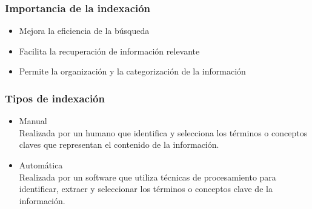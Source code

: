 \documentclass[
10pt, %
aspectratio=169, %
]{beamer}
\begin{document}
	\begin{frame}
		
		\frametitle{Importancia de la indexación}
		
		\begin{itemize}
			\item Mejora la eficiencia de la búsqueda
			
			\vspace{1\baselineskip}
			\item Facilita la recuperación de información relevante 
			
			\vspace{1\baselineskip}
			\item Permite la organización y la categorización de la información
		\end{itemize}
		
	\end{frame}
	
	\begin{frame}
		
		\frametitle{Tipos de indexación}
		
		\begin{itemize}
			\item Manual \\[1mm]
			Realizada por un humano que identifica y selecciona los términos o conceptos claves que representan el contenido de la información.
			
			\vspace{1\baselineskip}
			\item Automática \\[1mm]
			Realizada por un software que utiliza técnicas de procesamiento para identificar, extraer y seleccionar los términos o conceptos clave de la información.
			
		\end{itemize}
		
	\end{frame}
	
\end{document}
